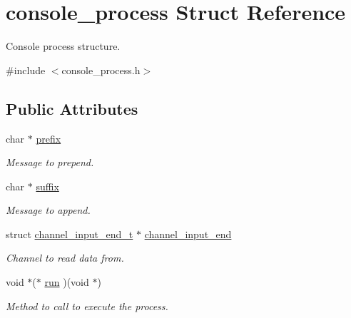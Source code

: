 \hypertarget{structconsole__process}{\section{console\-\_\-process Struct Reference}
\label{structconsole__process}
}


Console process structure.  




{\ttfamily \#include $<$console\-\_\-process.\-h$>$}

\subsection*{Public Attributes}
\begin{DoxyCompactItemize}
\item 
\hypertarget{structconsole__process_ab1a78dd31864c1aa1ea92772ae82d160}{char $\ast$ \hyperlink{structconsole__process_ab1a78dd31864c1aa1ea92772ae82d160}{prefix}}\label{structconsole__process_ab1a78dd31864c1aa1ea92772ae82d160}

\begin{DoxyCompactList}\small\item\em Message to prepend. \end{DoxyCompactList}\item 
\hypertarget{structconsole__process_a9cd2f30aaa307341040e152081c9f331}{char $\ast$ \hyperlink{structconsole__process_a9cd2f30aaa307341040e152081c9f331}{suffix}}\label{structconsole__process_a9cd2f30aaa307341040e152081c9f331}

\begin{DoxyCompactList}\small\item\em Message to append. \end{DoxyCompactList}\item 
\hypertarget{structconsole__process_ac78570f952325bc79f4c99d37ed2de1f}{struct \hyperlink{structchannel__input__end__t}{channel\-\_\-input\-\_\-end\-\_\-t} $\ast$ \hyperlink{structconsole__process_ac78570f952325bc79f4c99d37ed2de1f}{channel\-\_\-input\-\_\-end}}\label{structconsole__process_ac78570f952325bc79f4c99d37ed2de1f}

\begin{DoxyCompactList}\small\item\em Channel to read data from. \end{DoxyCompactList}\item 
\hypertarget{structconsole__process_ac05ffc910ea48ec6fc9499f0bcefee86}{void $\ast$($\ast$ \hyperlink{structconsole__process_ac05ffc910ea48ec6fc9499f0bcefee86}{run} )(void $\ast$)}\label{structconsole__process_ac05ffc910ea48ec6fc9499f0bcefee86}

\begin{DoxyCompactList}\small\item\em Method to call to execute the process. \end{DoxyCompactList}\end{DoxyCompactItemize}


